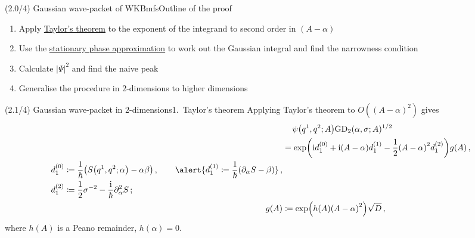 \documentclass[mathserif]{beamer}
\newcommand{\rbr}[1]{{\left(#1\right)}}
\newcommand{\vbr}[1]{{\left|#1\right|}}
\newcommand{\rfun}[2]{#1\mathopen{}\left(#2\right)\mathclose{}}
\newcommand\mi{\mathrm{i}} %
\newcommand{\Alpha}{A}
\begin{document}
\begin{frame}{(2.0/4) Gaussian wave-packet of WKBmfs}{Outline of the proof}
\begin{enumerate}
    \item 
    Apply \underline{Taylor's theorem} to the exponent of the integrand to
    second order in $\rbr{\Alpha-\alpha}$
    \item
    Use the \underline{stationary phase approximation} to work out the Gaussian
    integral and find the narrowness condition
    \item
    Calculate $\vbr{\varPsi}^2$ and find the naive peak
    \item
    Generalise the procedure in $2$-dimensions to higher dimensions
\end{enumerate}
\end{frame}

\begin{frame}{\boldmath (2.1/4) Gaussian wave-packet in $2$-dimensions}{1.\ Taylor's theorem}
    Applying Taylor's theorem to $\rfun{O}{\rbr{\Alpha-\alpha}^2}$ gives
\begin{subequations}
\begin{align}
    &\quad\, \rfun{\psi}{q^1, q^2; \Alpha} \rfun{\mathrm{GD}_2}{\alpha, \sigma; \Alpha}^{1/2}
    \nonumber \\
    & = \rfun{\exp}{\mi d^{(0)}_1 +
        \mi \rbr{\Alpha - \alpha} d^{(1)}_1 - \frac{1}{2} \rbr{\Alpha - \alpha}^2 d^{(2)}_1}
    \rfun{g}{\Alpha}\,,
    \label{eq:packet-gaussian-75a}\\
    \begin{split}
    d^{(0)}_1 &\coloneqq \frac{1}{\hslash}\rbr{\rfun{S}{q^1, q^2; \alpha} - \alpha \beta}\,,
    \qquad
    \alert{d^{(1)}_1 \coloneqq \frac{1}{\hslash}\rbr{\partial_{\alpha} S - \beta}}\,,
    \\
    d^{(2)}_1 &\coloneqq \frac{1}{2} \sigma^{-2} - \frac{\mi}{\hslash}\partial_{\alpha}^{2} S\,;
    \end{split}
    \\
    \rfun{g}{\Alpha} &\coloneqq \rfun{\exp}{\rfun{h}{\Alpha}\rbr{\Alpha - \alpha}^2}\sqrt{D}\,, 
\end{align}
\end{subequations}
where $\rfun{h}{\Alpha}$ is a Peano remainder, $\rfun{h}{\alpha} = 0$.
\end{frame}
\end{document}
